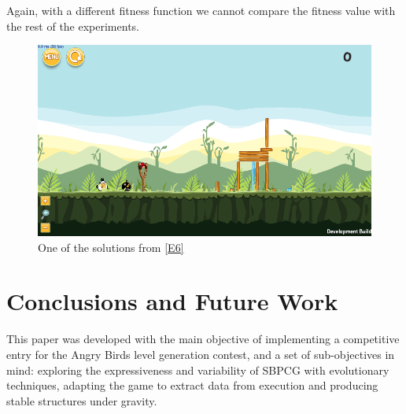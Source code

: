 \documentclass[sigconf]{acmart}
\begin{document}
Again, with a different fitness function we cannot compare the fitness value with the rest of the experiments.
 \begin{figure}
 	\centering
 	\includegraphics[scale=0.3]{E6.png}
 	\caption{One of the solutions from \ref{E6}}\label{f:e6}
 \end{figure}




%
\section{Conclusions and Future Work} 
\label{sec:conclusions}


This paper was developed with the main objective of implementing a
competitive entry for the Angry Birds level generation contest, and  a
set of sub-objectives in mind: exploring the expressiveness and variability of 
SBPCG with evolutionary techniques, adapting the game to extract data from 
execution and producing stable structures under gravity.
\end{document}
